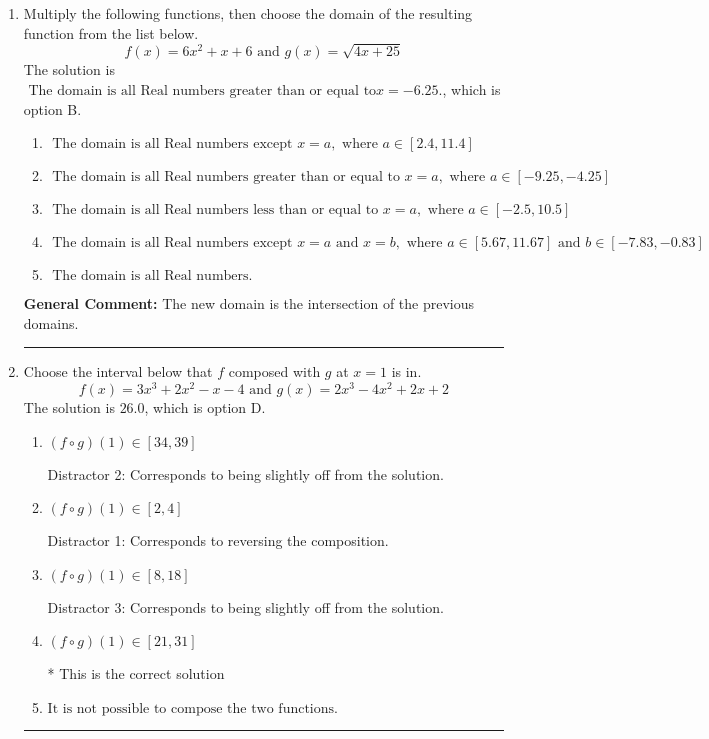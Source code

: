 \documentclass{extbook}[14pt]
\newcommand{\litem}[1]{\item #1

\rule{\textwidth}{0.4pt}}
\begin{document}
\begin{enumerate}\litem{
Multiply the following functions, then choose the domain of the resulting function from the list below.
\[ f(x) = 6x^{2} +x + 6 \text{ and } g(x) = \sqrt{4x+25}  \]The solution is \( \text{ The domain is all Real numbers greater than or equal to} x = -6.25. \), which is option B.\begin{enumerate}[label=\Alph*.]
\item \( \text{ The domain is all Real numbers except } x = a, \text{ where } a \in [2.4, 11.4] \)


\item \( \text{ The domain is all Real numbers greater than or equal to } x = a, \text{ where } a \in [-9.25, -4.25] \)


\item \( \text{ The domain is all Real numbers less than or equal to } x = a, \text{ where } a \in [-2.5, 10.5] \)


\item \( \text{ The domain is all Real numbers except } x = a \text{ and } x = b, \text{ where } a \in [5.67, 11.67] \text{ and } b \in [-7.83, -0.83] \)


\item \( \text{ The domain is all Real numbers. } \)


\end{enumerate}

\textbf{General Comment:} The new domain is the intersection of the previous domains.
}
\litem{
Choose the interval below that $f$ composed with $g$ at $x=1$ is in.
\[ f(x) = 3x^{3} +2 x^{2} -x -4 \text{ and } g(x) = 2x^{3} -4 x^{2} +2 x + 2 \]The solution is \( 26.0 \), which is option D.\begin{enumerate}[label=\Alph*.]
\item \( (f \circ g)(1) \in [34, 39] \)

 Distractor 2: Corresponds to being slightly off from the solution.
\item \( (f \circ g)(1) \in [2, 4] \)

 Distractor 1: Corresponds to reversing the composition.
\item \( (f \circ g)(1) \in [8, 18] \)

 Distractor 3: Corresponds to being slightly off from the solution.
\item \( (f \circ g)(1) \in [21, 31] \)

* This is the correct solution
\item \( \text{It is not possible to compose the two functions.} \)



\end{enumerate}}
\end{enumerate}
\end{document}
